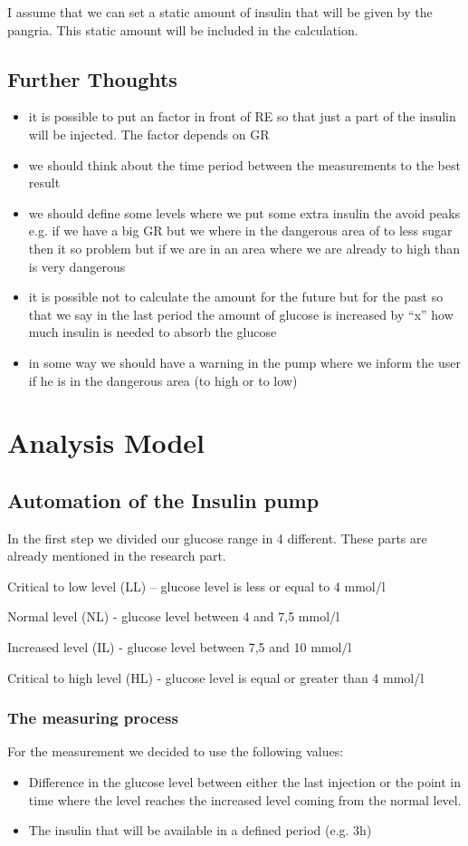 I assume that we can set a static amount of insulin that will be given by the
pangria. This static amount will be included in the calculation.

\subsection{Further Thoughts}
\begin{itemize}
  \item it is possible to put an factor in front of RE so that just a part of
  the insulin will be injected. The factor depends on GR
  \item we should think about the time period between the measurements to the
  best result
  \item we should define some levels where we put some extra insulin the avoid
  peaks e.g. if we have a big GR but we where in the dangerous area of to less
  sugar then it so problem but if we are in an area where we are already to
  high than is very dangerous
  \item it is possible not to calculate the amount for the future but for the
  past so that we say in the last period the amount of glucose is increased  by
  ``x'' how much insulin is needed to absorb the glucose
  \item in some way we should have a warning in the pump where we inform the
  user if he is in the dangerous area (to high or to low)
\end{itemize}

\section{Analysis Model}

\subsection{Automation of the Insulin pump}
In the first step we divided our glucose range in 4 different. These parts are already mentioned in the research part.

Critical to low level (LL) – glucose level is less or equal to 4 mmol/l

Normal  level (NL) - glucose level between 4 and 7,5 mmol/l

Increased level (IL) - glucose level between 7,5 and 10 mmol/l

Critical to high level (HL) - glucose level is equal or greater than 4 mmol/l

\subsubsection{The measuring process}
For the measurement we decided to use the following values:
\begin{itemize}
  \item Difference in the glucose level between either the last injection or
  the point in time where the level reaches the increased level coming from the normal level.
  \item The insulin that will be available in a defined period (e.g. 3h) 
\end{itemize}

